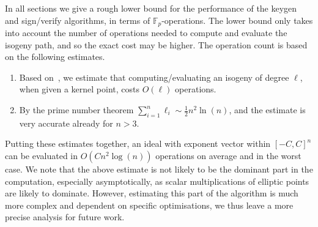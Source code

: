 \documentclass{llncs}
\newcommand{\F}{\mathbb{F}}
\begin{document}
In all sections we give a rough lower bound for the performance of the keygen and sign/verify algorithms, in terms of $\F_p$-operations.
The lower bound only takes into account the number of operations needed to compute and evaluate the isogeny path, and so the exact cost may be higher.
The operation count is based on the following estimates.
\begin{enumerate}
\item Based
  on~\cite{10.1007/978-3-319-70697-9_11,10.1007/978-3-319-79063-3_11},
  we estimate that computing/evaluating an isogeny of degree $\ell$, when given a kernel point,
  costs $O(\ell)$ operations.
\item By the prime number theorem $\sum_{i=1}^n\ell_i\sim\frac{1}{2}n^2\ln(n)$, and the estimate is very accurate already for $n>3$.
\end{enumerate}
Putting these estimates together, an ideal with exponent vector within $[-C,C]^n$ can be evaluated in $O(Cn^2\log(n))$ operations on average and in the worst case. We note that the above estimate is not likely to be the dominant part in the computation, especially asymptotically,
as scalar multiplications of elliptic points are likely to dominate.
However, estimating this part of the algorithm is much more complex and dependent on specific optimisations, we thus leave a more precise analysis for future work.
\end{document}
